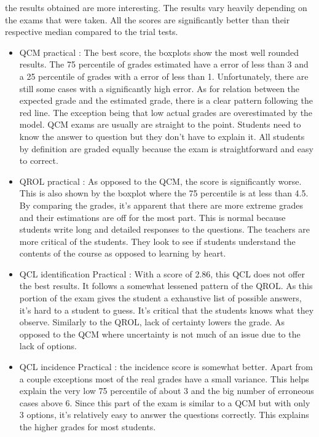 \documentclass[a4paper,11pt]{report}
\numberwithin{figure}{section} %
\begin{document}
	the results obtained are more interesting. The results vary heavily depending on the exams that were taken. All the scores are significantly better than their respective median compared to the trial tests.
    \begin{itemize}
    \item[\textbullet]  QCM practical : The best score, the boxplots show the most well rounded results. The 75 percentile of grades estimated have a error of less than 3 and a 25 percentile of grades with a error of less than 1. Unfortunately, there are still some cases with a significantly high error. As for relation between the expected grade and the estimated grade, there is a clear pattern following the red line. The exception being that low actual grades are overestimated by the model. QCM exams are usually are straight to the point. Students need to know the answer to question but they don't have to explain it. All students by definition are graded equally because the exam is straightforward and easy to correct.
    \item[\textbullet]  QROL practical : As opposed to the QCM, the score is significantly worse. This is also shown by the boxplot where the 75 percentile is at less than 4.5. By comparing the grades, it's apparent that there are more extreme grades and their estimations are off for the most part. This is normal because students write long and detailed responses to the questions. The teachers are more critical of the students. They look to see if students understand the contents of the course as opposed to learning by heart.
    \item[\textbullet]  QCL identification Practical : With a score of 2.86, this QCL does not offer the best results. It follows a somewhat lessened pattern of the QROL. As this portion of the exam gives the student a exhaustive list of possible answers, it's hard to a student to guess. It's critical that the students knows what they observe. Similarly to the QROL, lack of certainty lowers the grade. As opposed to the QCM where uncertainty is not much of an issue due to the lack of options.
    \item[\textbullet]  QCL incidence Practical : the incidence score  is somewhat better. Apart from a couple exceptions most of the real grades have a small variance. This helps explain the very low 75 percentile of about 3 and the big number of erroneous cases above 6. Since this part of the exam is similar to a QCM but with only 3 options, it's relatively easy to answer the questions correctly. This explains the higher grades for most students.
    \end{itemize}
    
\end{document}
